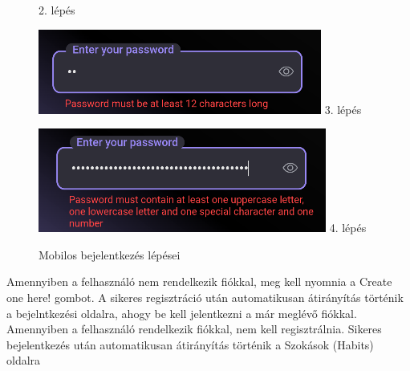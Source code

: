 \documentclass[12pt]{report}
\begin{document}
\begin{figure}[H]
\begin{minipage}[b]{0.23\textwidth}
       2. lépés
    \end{minipage}
    \hfill
    \begin{minipage}[b]{0.23\textwidth}
        \centering
        \includegraphics[width=\linewidth]{src/loginpage3.png}
        3. lépés
    \end{minipage}
    \hfill
    \begin{minipage}[b]{0.23\textwidth}
        \centering
        \includegraphics[width=\linewidth]{src/loginpage4.png}
        4. lépés
    \end{minipage}
   Mobilos bejelentkezés lépései
    \label{fig:login-steps}
\end{figure}

Amennyiben a felhasználó nem rendelkezik fiókkal, meg kell nyomnia a Create one here! gombot.  A sikeres regisztráció után automatikusan átirányítás történik a bejelntkezési oldalra, ahogy be kell jelentkezni a már meglévő fiókkal. Amennyiben a felhasználó rendelkezik fiókkal, nem kell regisztrálnia. Sikeres bejelentkezés után automatikusan átirányítás történik a Szokások (Habits) oldalra
\end{document}
